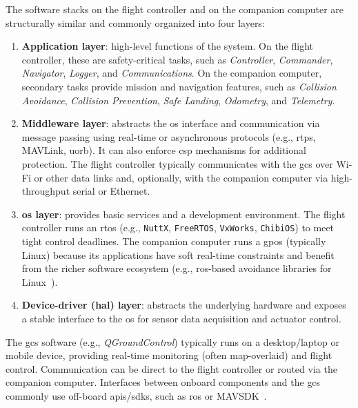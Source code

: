 The software stacks on the flight controller and on the companion computer are structurally similar and commonly organized into four layers:

\begin{enumerate}
\item \textbf{Application layer}: high-level functions of the system. 
      On the flight controller, these are safety-critical tasks, such as \emph{Controller}, \emph{Commander}, \emph{Navigator}, \emph{Logger}, and \emph{Communications}. 
      On the companion computer, secondary tasks provide mission and navigation features, such as \emph{Collision Avoidance}, \emph{Collision Prevention}, \emph{Safe Landing}, \emph{Odometry}, and \emph{Telemetry}.

\item \textbf{Middleware layer}: abstracts the \gls{os} interface and communication via message passing using real-time or asynchronous protocols (e.g., \gls{rtps}, MAVLink, \gls{uorb}). 
      It can also enforce \gls{csp} mechanisms for additional protection. 
      The flight controller typically communicates with the \gls{gcs} over Wi-Fi or other data links and, optionally, with the companion computer via high-throughput serial or Ethernet.

\item \textbf{\gls{os} layer}: provides basic services and a development environment. 
      The flight controller runs an \gls{rtos} (e.g., \lstinline|NuttX|, \lstinline|FreeRTOS|, \lstinline|VxWorks|, \lstinline|ChibiOS|) to meet tight control deadlines. 
      The companion computer runs a \gls{gpos} (typically Linux) because its applications have soft real-time constraints and benefit from the richer software ecosystem (e.g., \gls{ros}-based avoidance libraries for Linux~\cite{px4-sysArch}).

\item \textbf{Device-driver (\gls{hal}) layer}: abstracts the underlying hardware and exposes a stable interface to the \gls{os} for sensor data acquisition and actuator control.
\end{enumerate}

The \gls{gcs} software (e.g., \emph{QGroundControl}) typically runs on a desktop/laptop or mobile device, providing real-time monitoring (often map-overlaid) and flight control. 
Communication can be direct to the flight controller or routed via the companion computer. 
Interfaces between onboard components and the \gls{gcs} commonly use off-board \glspl{api}/\glspl{sdk}, such as \gls{ros} or MAVSDK~\cite{px4-sysArch}.

